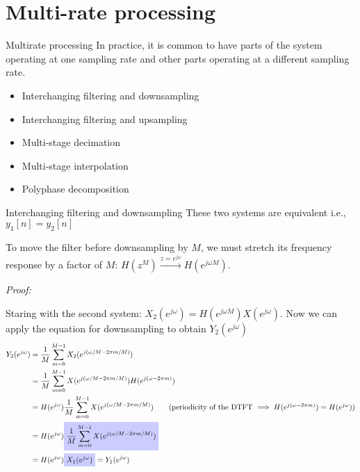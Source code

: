 \documentclass[10pt, handout]{beamer}
\begin{document}
% 
\section{Multi-rate processing}
\begin{frame}{Multirate processing}
	In practice, it is common to have parts of the system operating at one sampling rate and other parts operating at a different sampling rate.
	\begin{itemize}
		\item Interchanging filtering and downsampling
		\item Interchanging filtering and upsampling
		\item Multi-stage decimation
		\item Multi-stage interpolation
		\item Polyphase decomposition
	\end{itemize}

\end{frame}

\begin{frame}{Interchanging filtering and downsampling}
	These two systems are equivalent i.e., $y_1[n] = y_2[n]$
	\begin{center}
		\resizebox{0.6\linewidth}{!}{}
	\end{center}	

	To move the filter before downsampling by $M$, we must stretch its frequency response by a factor of $M$: $H(z^M) \xrightarrow{z = e^{j\omega}} H(e^{j\omega M})$.
\end{frame}

\begin{frame}
	\textit{Proof:}
	
	Staring with the second system: $X_2(e^{j\omega}) = H(e^{j\omega M})X(e^{j\omega})$. Now we can apply the equation for downsampling to obtain $Y_2(e^{j\omega})$
	\begin{align*}
	Y_2(e^{j\omega}) &= \frac{1}{M}\sum_{m= 0}^{M-1} X_2(e^{j(\omega/M - 2\pi m/M)}) \\
	&=\frac{1}{M}\sum_{m= 0}^{M-1} X(e^{j(\omega/M - 2\pi m/M)})H(e^{j(\omega - 2\pi m)}) \\
	&=H(e^{j\omega})\frac{1}{M}\sum_{m= 0}^{M-1} X(e^{j(\omega/M - 2\pi m/M)}) \tag{periodicity of the DTFT $\implies H(e^{j(\omega - 2\pi m)}) = H(e^{j\omega})$} \\
	&=H(e^{j\omega})\tikz[baseline]{\node[fill=blue!20,anchor=base] {$\displaystyle\frac{1}{M}\sum_{m= 0}^{M-1} X(e^{j(\omega/M - 2\pi m/M)})$};} \\
	&=H(e^{j\omega})\tikz[baseline]{\node[fill=blue!20,anchor=base] {$X_1(e^{j\omega})$};} = Y_1(e^{j\omega})
	\end{align*}
\end{frame}
\end{document}
